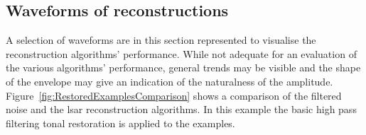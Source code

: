 %

\subsection{Waveforms of reconstructions}
A selection of waveforms are in this section represented to visualise the reconstruction algorithms' performance. While not adequate for an evaluation of the various algorithms' performance, general trends may be visible and the shape of the envelope may give an indication of the naturalness of the amplitude. Figure~\ref{fig:RestoredExamplesComparison} shows a comparison of the filtered noise and the \DIFdelbegin {}\DIFdelend \DIFaddbegin \gls{lsar} \DIFaddend reconstruction algorithms. In this example the basic high pass filtering tonal restoration is applied to the examples.

